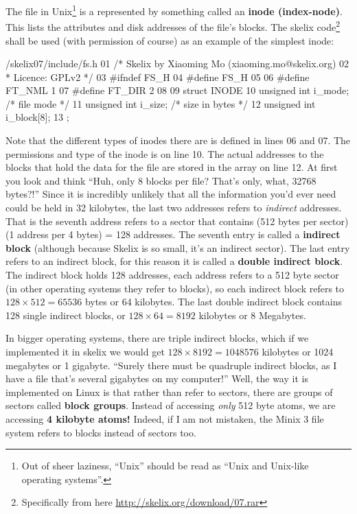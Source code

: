\documentclass{article}
\begin{document}
The file in Unix\footnote{Out of sheer laziness, ``Unix'' should be read as ``Unix and Unix-like operating systems''.} is a represented by something called an \textbf{inode (index-node)}. This lists the attributes and disk addresses of the file's blocks. The skelix code\footnote{Specifically from here \url{http://skelix.org/download/07.rar}} shall be used (with permission of course) as an example of the simplest inode:
\begin{code}{/skelix07/include/fs.h}
01 /* Skelix by Xiaoming Mo (xiaoming.mo@skelix.org)
02  * Licence: GPLv2 */
03 #ifndef FS_H
04 #define FS_H
05 
06 #define FT_NML    1
07 #define FT_DIR    2
08
09 struct INODE {
10     unsigned int i_mode;        /* file mode */
11     unsigned int i_size;        /* size in bytes */
12     unsigned int i_block[8];
13 };
\end{code}
Note that the different types of inodes there are is defined in lines 06 and 07. The permissions and type of the inode is on line 10. The actual addresses to the blocks that hold the data for the file are stored in the array on line 12. At first you look and think ``Huh, only 8 blocks per file? That's only, what, 32768 bytes?!'' Since it is incredibly unlikely that all the information you'd ever need could be held in 32 kilobytes, the last two addresses refers to \textit{indirect} addresses. That is the seventh address refers to a sector that contains (512 bytes per sector)(1 address per 4 bytes) = 128 addresses. The seventh entry is called a \textbf{indirect block} (although because Skelix is so small, it's an indirect sector). The last entry refers to an indirect block, for this reason it is called a \textbf{double indirect block}. The indirect block holds 128 addresses, each address refers to a 512 byte sector (in other operating systems they refer to blocks), so each indirect block refers to $128\times 512 = 65536$ bytes or 64 kilobytes. The last double indirect block contains 128 single indirect blocks, or $128\times 64 = 8192$ kilobytes or 8 Megabytes.

In bigger operating systems, there are triple indirect blocks, which if we implemented it in skelix we would get $128\times 8192 = 1048576$ kilobytes or 1024 megabytes or 1 gigabyte. ``Surely there must be quadruple indirect blocks, as I have a file that's several gigabytes on my computer!'' Well, the way it is implemented on Linux is that rather than refer to sectors, there are groups of sectors called \textbf{block groups}. Instead of accessing \textit{only} 512 byte atoms, we are accessing \textbf{4 kilobyte atoms!} Indeed, if I am not mistaken, the Minix 3 file system refers to blocks instead of sectors too.
\end{document}
